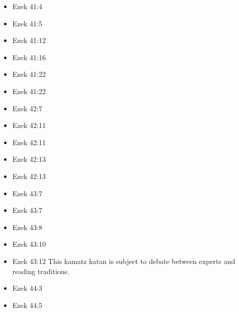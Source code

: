 \documentclass[14pt]{article}
\begin{document}
\begin{multicols}{2}
\begin{itemize}
														\item Ezek 41:4
														
														\item Ezek 41:5
														
														\item Ezek 41:12
														
														\item Ezek 41:16
														
														\item Ezek 41:22
														
														\item Ezek 41:22
														
														\item Ezek 42:7
														
														\item Ezek 42:11
														
														\item Ezek 42:11
														
														\item Ezek 42:13
														
														\item Ezek 42:13
														
														\item Ezek 43:7
														
														\item Ezek 43:7
														
														\item Ezek 43:8
														
														\item Ezek 43:10
														
														\item Ezek 43:12 This kamatz katan is subject to debate between experts and reading traditions.
														
														\item Ezek 44:3
														
														\item Ezek 44:5
														

\end{itemize}
\end{multicols}
\end{document}
